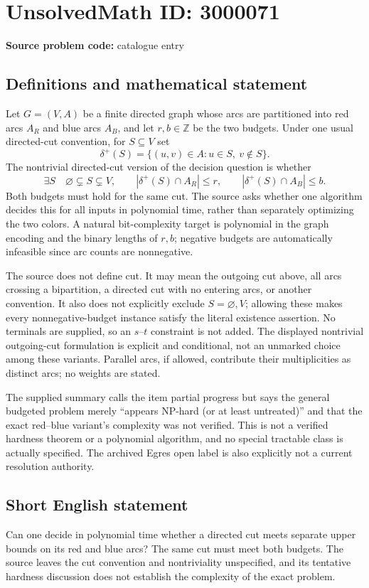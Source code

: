 \documentclass[11pt]{article}
\newcommand{\Z}{\mathbb{Z}}
\begin{document}
\section*{UnsolvedMath ID: 3000071}
\textbf{Source problem code:} catalogue entry
\subsection{Definitions and mathematical statement}
Let $G=(V,A)$ be a finite directed graph whose arcs are partitioned into red arcs $A_R$ and blue arcs $A_B$, and let $r,b\in\Z$ be the two budgets. Under one usual directed-cut convention, for $S\subseteq V$ set
\[
\delta^+(S)=\{(u,v)\in A:u\in S,\ v\notin S\}.
\]
The nontrivial directed-cut version of the decision question is whether
\[
\exists S\quad \varnothing\subsetneq S\subsetneq V,\qquad
|\delta^+(S)\cap A_R|\le r,\qquad
|\delta^+(S)\cap A_B|\le b.
\]
Both budgets must hold for the same cut. The source asks whether one algorithm decides this for all inputs in polynomial time, rather than separately optimizing the two colors. A natural bit-complexity target is polynomial in the graph encoding and the binary lengths of $r,b$; negative budgets are automatically infeasible since arc counts are nonnegative.

The source does not define cut. It may mean the outgoing cut above, all arcs crossing a bipartition, a directed cut with no entering arcs, or another convention. It also does not explicitly exclude $S=\varnothing,V$; allowing these makes every nonnegative-budget instance satisfy the literal existence assertion. No terminals are supplied, so an $s$--$t$ constraint is not added. The displayed nontrivial outgoing-cut formulation is explicit and conditional, not an unmarked choice among these variants. Parallel arcs, if allowed, contribute their multiplicities as distinct arcs; no weights are stated.

The supplied summary calls the item partial progress but says the general budgeted problem merely ``appears NP-hard (or at least untreated)'' and that the exact red--blue variant's complexity was not verified. This is not a verified hardness theorem or a polynomial algorithm, and no special tractable class is actually specified. The archived Egres open label is also explicitly not a current resolution authority.
\subsection{Short English statement}
Can one decide in polynomial time whether a directed cut meets separate upper bounds on its red and blue arcs? The same cut must meet both budgets. The source leaves the cut convention and nontriviality unspecified, and its tentative hardness discussion does not establish the complexity of the exact problem.
\end{document}
